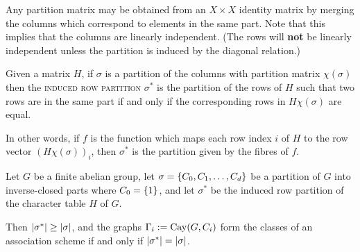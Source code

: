 \documentclass{report}
\begin{document}
    Any partition matrix may be obtained from an $X \times X$ identity matrix by
    merging the columns which correspond to elements in the same part.
    Note that this implies that the columns are linearly independent.
    (The rows will \textbf{not} be linearly independent unless the partition
    is induced by the diagonal relation.)

    \begin{defn}\label{induced-row-partition}
      Given a matrix $H$, if $\sigma$ is a partition of the columns with
      partition matrix $\chi(\sigma)$ then the \textsc{induced row partition}
      $\sigma^*$ is the partition of the rows of $H$ such that two rows are in the
      same part if and only if the corresponding rows in $H\chi(\sigma)$ are
      equal.
    \end{defn}

    In other words, if $f$ is the function which maps each row index
    $i$ of $H$ to the row vector $(H\chi(\sigma))_i$, then $\sigma^*$ is the
    partition given by the fibres of $f$.
    \cite[Section 12.7]{godsil}

    \begin{thm}
      \label{translation-char}
      Let $G$ be a finite abelian group,
      let $\sigma = \left\lbrace C_0, C_1, \ldots, C_d \right\rbrace$ be a partition of $G$
      into inverse-closed parts where $C_0 = \left\lbrace 1 \right\rbrace$, and
      let $\sigma^*$ be the induced row partition
      of the character table $H$ of $G$.

      Then $\left\lvert \sigma^* \right\rvert \geq \left\lvert \sigma \right\rvert$,
      and the graphs $\Gamma_i := \operatorname{Cay}(G, C_i)$ form the classes of an
      association scheme if and only if $\left\lvert \sigma^* \right\rvert = \left\lvert \sigma \right\rvert$.
    \end{thm}
\end{document}
